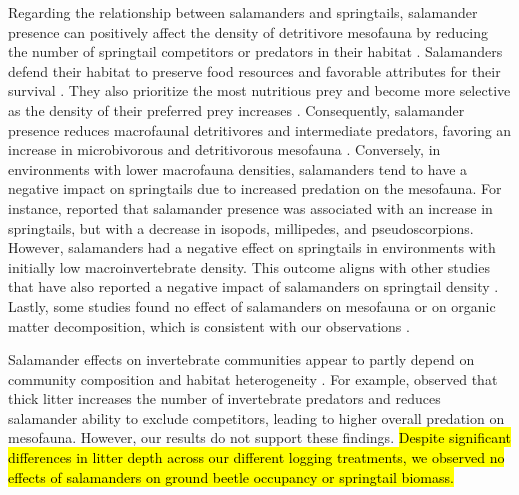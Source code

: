 Regarding the relationship between salamanders and springtails, salamander presence can positively affect the density of detritivore mesofauna by reducing the number of springtail competitors or predators in their habitat \citep{Wyman1998Experimentalassessment,Rooney2000impactsalamander,Walton2005Contrastingeffects,Walton2006Salamandersforestfloor}. 
Salamanders defend their habitat to preserve food resources and favorable attributes for their survival \citep{Gall2003BehavioralInteractions,Hickerson2004Behavioralinteractions,Hickerson2012Interactionsforestfloor}. 
They also prioritize the most nutritious prey and become more selective as the density of their preferred prey increases \citep{Jaeger1981Foragingtactics,Jaeger1982ForagingTactics}. 
Consequently, salamander presence reduces macrofaunal detritivores and intermediate predators, favoring an increase in microbivorous and detritivorous mesofauna \citep{Rooney2000impactsalamander,Walton2005Contrastingeffects,Walton2006Salamandersforestfloor}. 
Conversely, in environments with lower macrofauna densities, salamanders tend to have a negative impact on springtails due to increased predation on the mesofauna. 
For instance, \cite{Walton2006Salamandersforestfloor} reported that salamander presence was associated with an increase in springtails, but with a decrease in isopods, millipedes, and pseudoscorpions. 
However, salamanders had a negative effect on springtails in environments with initially low macroinvertebrate density. 
This outcome aligns with other studies that have also reported a negative impact of salamanders on springtail density \citep{Hickerson2017Easternredbacked}. 
Lastly, some studies found no effect of salamanders on mesofauna or on organic matter decomposition, which is consistent with our observations \citep{Hocking2013Effectsexperimental,Hocking2014Effectsredbacked}.

Salamander effects on invertebrate communities appear to partly depend on community composition and habitat heterogeneity \citep{MichaelWalton2005Salamandersforestfloor,Walton2006Salamandersforestfloor,Walton2013Topdownregulation,Best2014trophicrole}. 
For example, \cite{Walton2013Topdownregulation} observed that thick litter increases the number of invertebrate predators and reduces salamander ability to exclude competitors, leading to higher overall predation on mesofauna. 
However, our results do not support these findings. 
\hl{Despite significant differences in litter depth across our different logging treatments, we observed no effects of salamanders on ground beetle occupancy or springtail biomass.}

